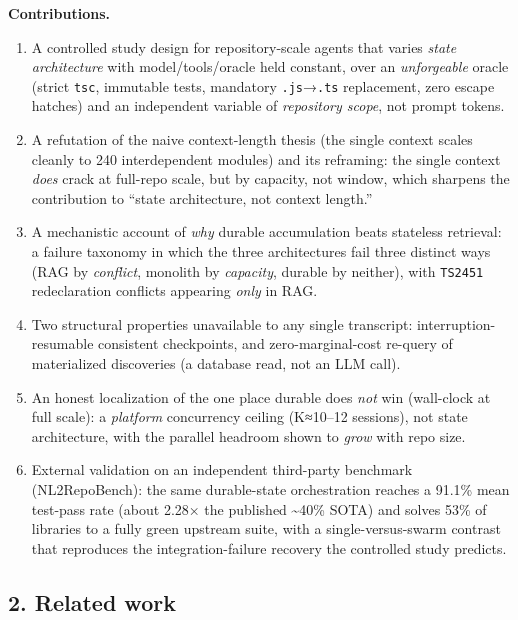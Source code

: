 \documentclass[
  10pt,
]{article}
\providecommand{\tightlist}{%
  \setlength{\itemsep}{0pt}\setlength{\parskip}{0pt}}
\begin{document}
\textbf{Contributions.}

\begin{enumerate}
\def\labelenumi{\arabic{enumi}.}
\tightlist
\item
  A controlled study design for repository-scale agents that varies
  \emph{state architecture} with model/tools/oracle held constant, over
  an \emph{unforgeable} oracle (strict \texttt{tsc}, immutable tests,
  mandatory \texttt{.js}→\texttt{.ts} replacement, zero escape hatches)
  and an independent variable of \emph{repository scope}, not prompt
  tokens.
\item
  A refutation of the naive context-length thesis (the single context
  scales cleanly to 240 interdependent modules) and its reframing: the
  single context \emph{does} crack at full-repo scale, but by capacity,
  not window, which sharpens the contribution to ``state architecture,
  not context length.''
\item
  A mechanistic account of \emph{why} durable accumulation beats
  stateless retrieval: a failure taxonomy in which the three
  architectures fail three distinct ways (RAG by \emph{conflict},
  monolith by \emph{capacity}, durable by neither), with \texttt{TS2451}
  redeclaration conflicts appearing \emph{only} in RAG.
\item
  Two structural properties unavailable to any single transcript:
  interruption-resumable consistent checkpoints, and zero-marginal-cost
  re-query of materialized discoveries (a database read, not an LLM
  call).
\item
  An honest localization of the one place durable does \emph{not} win
  (wall-clock at full scale): a \emph{platform} concurrency ceiling
  (K≈10--12 sessions), not state architecture, with the parallel
  headroom shown to \emph{grow} with repo size.
\item
  External validation on an independent third-party benchmark
  (NL2RepoBench): the same durable-state orchestration reaches a 91.1\%
  mean test-pass rate (about 2.28× the published \textasciitilde40\%
  SOTA) and solves 53\% of libraries to a fully green upstream suite,
  with a single-versus-swarm contrast that reproduces the
  integration-failure recovery the controlled study predicts.
\end{enumerate}

\subsection{2. Related work}\label{related-work}
\end{document}
